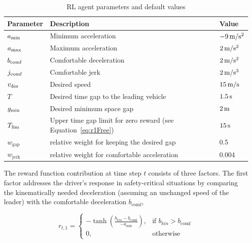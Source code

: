 \documentclass[review]{elsarticle}
\providecommand{\sub}[1]{_{\mathrm{#1}}}  %
\providecommand{\3}{{\ss}}
\begin{document}
	\begin{table}
		\caption{RL agent parameters and default values} 
		\label{tab:agentParameters} 
		\begin{center}
			\begin{tabular}{ p{}| p{}| p{}}
				Parameter & Description & Value \\ \hline
				$a\sub{\rm min}$ & Minimum acceleration & $\unit[-9]{m/s^2}$ \\  
				$a_{\rm max}$ & Maximum acceleration & $\unit[2]{m/s^2}$ \\  
				$b_{\rm comf}$ & Comfortable deceleration & $\unit[2]{m/s^2}$ \\  
				$j_{\rm comf}$ & Comfortable jerk & $\unit[2]{m/s^3}$ \\  
				$v_{\rm des}$ & Desired speed & $\unit[15]{ m/s}$ \\  		
				$T$ & Desired time gap to the leading vehicle & $\unit[1.5]{s}$ \\
				$g_{\rm min}$ & Desired minimum space gap & $\unit[2]{m}$ \\
				$T_{\rm lim}$ & Upper time gap limit for zero reward (see
				Equation~\eqref{eq:r1Free}) & $\unit[15]{s}$ \\
				$w\sub{gap}$ & relative weight for keeping the desired gap & 0.5\\
				$w\sub{jerk}$ & relative weight for comfortable acceleration & 0.004\\
			\end{tabular}
		\end{center}
	\end{table}
	
	
	
	The reward function contribution at time step $t$ consists of three factors. 
	The first factor addresses the driver's
	response in safety-critical situations by comparing the
	kinematically needed deceleration (assuming an
	unchanged speed of the leader) with the
	comfortable deceleration $b\sub{comf}$,
	
	
	
	\begin{equation}
	\label{eq:r1_CFP}
	r_{t,1} = 
	\begin{cases}
	-\tanh\left(\frac{b_{kin}-b\sub{comf}}{-a\sub{min}}\right),& \text{if } b_{kin}>b\sub{comf}\\
	0,              & \text{otherwise}
	\end{cases}
	\end{equation}
	
\end{document}
